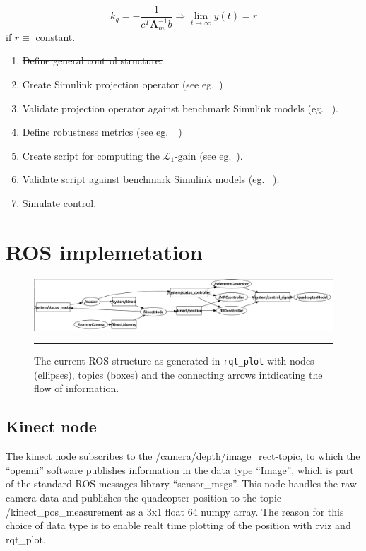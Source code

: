 \documentclass{article}
\begin{document}
\begin{equation}
k_g =-\frac{1}{c^T\mathbf{A}_m^{-1}b} \Rightarrow \lim_{t\rightarrow\infty}y(t) = r
\end{equation}
if $r \equiv$ constant.
\begin{enumerate}
\subsubsection*{TODO}
\item \sout{Define general control structure.}
\item Create Simulink projection operator (see eg.~\cite{L1control})
\item Validate projection operator against benchmark Simulink models (eg. ~\cite{cao2006design}).
\item Define robustness metrics (see eg.~\cite{L1control}~\cite{huynh20141})
\item Create script for computing the $\mathcal{L}_1$-gain (see eg.~\cite{L1control}).
\item Validate script against benchmark Simulink models (eg. ~\cite{cao2006design}).
\item Simulate control.
\end{enumerate}

\section{ROS implemetation}

\begin{figure}[htbp]
\centering
\includegraphics[width=\textwidth,trim={1mm 0 0 0.7mm},clip]{figures/ROSstruct.png}
\rule{35em}{0.5pt}
\caption{The current ROS structure as generated in \texttt{rqt\_plot} with nodes (ellipses), topics (boxes) and the connecting arrows intdicating the flow of information.}
\label{fig:ROSstruct}
\end{figure}
\subsection{Kinect node}
The kinect node subscribes to the /camera/depth/image\_rect-topic, to which the ``openni'' software publishes information in the data type ``Image'', which is part of the standard ROS messages library ``sensor\_msgs''. This node handles the raw camera data and publishes the quadcopter position to the topic /kinect\_pos\_measurement as a 3x1 float 64 numpy array. The reason for this choice of data type is to enable realt time plotting of the position with rviz and rqt\_plot.
\end{document}
